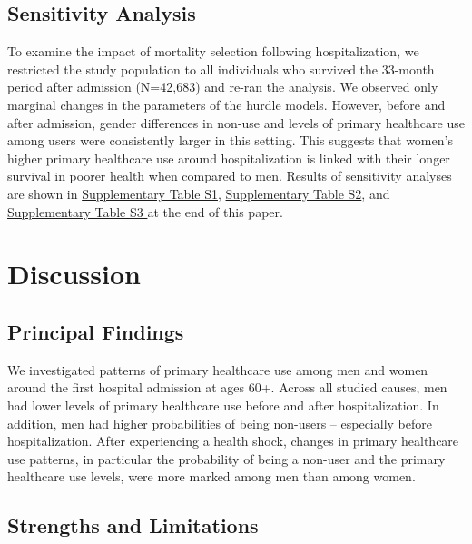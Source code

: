 \subsection{Sensitivity Analysis}
To examine the impact of mortality selection following hospitalization, 
we restricted the study population to all individuals who survived the 
33-month period after admission (N=42,683) and re-ran the analysis. We 
observed only marginal changes in the parameters of the hurdle models. 
However, before and after admission, gender differences in non-use and 
levels of primary healthcare use among users were consistently larger 
in this setting. This suggests that women's higher primary healthcare 
use around hospitalization is linked with their longer survival in 
poorer health when compared to men. Results of sensitivity analyses 
are shown in \hyperref[ch3:tabS1]{Supplementary Table S1}, 
\hyperref[ch3:tabS2]{Supplementary Table S2}, and
\hyperref[ch3:tabS3]{Supplementary Table S3 } at the end of this paper.\\



\section{Discussion}

\subsection{Principal Findings}

We investigated patterns of primary healthcare use among men and women 
around the first hospital admission at ages 60+. Across all studied 
causes, men had lower levels of primary healthcare use before and 
after hospitalization. In addition, men had higher probabilities of 
being non-users -- especially before hospitalization. After experiencing 
a health shock, changes in primary healthcare use patterns, in particular 
the probability of being a non-user and the primary healthcare use 
levels, were more marked  among men than among women.\\

\subsection{Strengths and Limitations}

